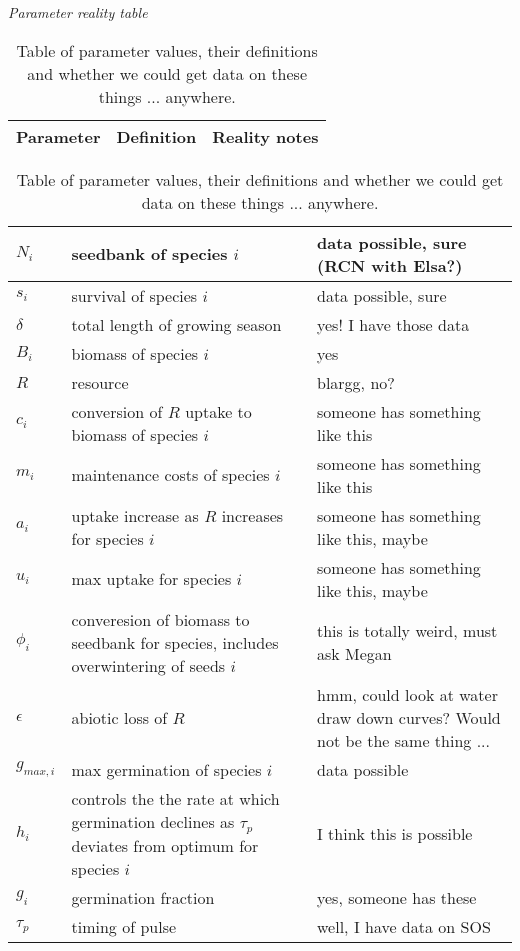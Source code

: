 \documentclass[11pt,a4paper,oneside]{article}
\begin{document}
\renewcommand{\labelitemi}{$-$}


\noindent \emph{Parameter reality table}
\begin{center}
\begin{table}[h!]
\caption{Table of parameter values, their definitions and whether we could get data on these things ... anywhere.}
\begin{tabular}{ | p{3cm} | p{6cm} | p{4.0cm} |}
\hline 
Parameter & Definition & Reality notes \\ \hline 
\end{tabular}
\begin{tabular}{ | p{3.0cm} | p{6.0cm} | p{4.0cm} |}
\(N_{i}\) & seedbank of species \(i\) & data possible, sure (RCN with Elsa?) \\ \hline
\(s_{i}\) & survival of species \(i\) & data possible, sure \\ \hline
\(\delta\) & total length of growing season & yes! I have those data\\ \hline
\(B_{i}\) & biomass of species \(i\) & yes \\ \hline
\(R\) & resource & blargg, no?\\ \hline
\(c_{i}\) & conversion of \(R\) uptake to biomass of species \(i\) &  someone has something like this \\ \hline
\(m_{i}\) & maintenance costs of species \(i\) & someone has something like this \\ \hline
\(a_{i}\) & uptake increase as \(R\) increases for species \(i\) & someone has something like this, maybe\\ \hline
\(u_{i}\) & max uptake for species \(i\) & someone has something like this, maybe \\ \hline
\(\phi_{i}\) & converesion of biomass to seedbank for species, includes overwintering of seeds \(i\) & this is totally weird, must ask Megan \\ \hline
\(\epsilon\) & abiotic loss of \(R\) & hmm, could look at water draw down curves? Would not be the same thing ... \\ \hline
\(g_{max,i}\) & max germination of species \(i\) & data possible \\ \hline
\(h_{i}\) &  controls the the rate at which germination declines as \(\tau_{p}\) deviates from optimum for species \(i\)  & I think this is possible \\ \hline
\(g_{i}\) & germination fraction & yes, someone has these \\ \hline
\(\tau_{p}\) & timing of pulse & well, I have data on SOS \\ \hline

\end{tabular}
\end{table}
\end{center}
\end{document}
